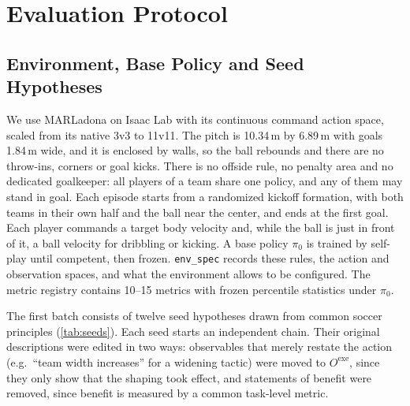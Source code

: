 \documentclass[11pt]{article}
\newcommand{\code}[1]{\texttt{\small #1}}
\begin{document}
\section{Evaluation Protocol}
\label{sec:protocol}

\subsection{Environment, Base Policy and Seed Hypotheses}

We use MARLadona \citep{li2025marladona} on Isaac Lab with its continuous command action space, scaled from its native 3v3 to 11v11.
The pitch is 10.34\,m by 6.89\,m with goals 1.84\,m wide, and it is enclosed by walls, so the ball rebounds and there are no throw-ins, corners or goal kicks.
There is no offside rule, no penalty area and no dedicated goalkeeper: all players of a team share one policy, and any of them may stand in goal.
Each episode starts from a randomized kickoff formation, with both teams in their own half and the ball near the center, and ends at the first goal.
Each player commands a target body velocity and, while the ball is just in front of it, a ball velocity for dribbling or kicking.
A base policy $\pi_0$ is trained by self-play until competent, then frozen.
\code{env\_spec} records these rules, the action and observation spaces, and what the environment allows to be configured.
The metric registry contains 10--15 metrics with frozen percentile statistics under $\pi_0$.

The first batch consists of twelve seed hypotheses drawn from common soccer principles (\cref{tab:seeds}).
Each seed starts an independent chain.
Their original descriptions were edited in two ways: observables that merely restate the action (e.g.\ ``team width increases'' for a widening tactic) were moved to $O^{\mathrm{exe}}$, since they only show that the shaping took effect, and statements of benefit were removed, since benefit is measured by a common task-level metric.
\end{document}
